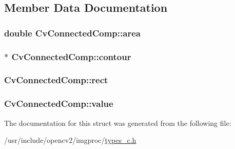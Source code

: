 \subsection{Member Data Documentation}
\hypertarget{structCvConnectedComp_affec9c260f6ca4fd3fae028f0ad3d9a4}{
\subsubsection[{area}]{\setlength{\rightskip}{0pt plus 5cm}double Cv\-Connected\-Comp\-::area}}\label{structCvConnectedComp_affec9c260f6ca4fd3fae028f0ad3d9a4}
\hypertarget{structCvConnectedComp_ae4f461290aa042a2dcd3b45ae03d9feb}{
\subsubsection[{contour}]{$\ast$ Cv\-Connected\-Comp\-::contour}}\label{structCvConnectedComp_ae4f461290aa042a2dcd3b45ae03d9feb}
\hypertarget{structCvConnectedComp_a1f86bb7ed32ddf315d19521e20beabcc}{
\subsubsection[{rect}]{ Cv\-Connected\-Comp\-::rect}}\label{structCvConnectedComp_a1f86bb7ed32ddf315d19521e20beabcc}
\hypertarget{structCvConnectedComp_aacf4c20a51f3fc7d8a71c95b46820902}{
\subsubsection[{value}]{ Cv\-Connected\-Comp\-::value}}\label{structCvConnectedComp_aacf4c20a51f3fc7d8a71c95b46820902}


The documentation for this struct was generated from the following file\-:\begin{DoxyCompactItemize}
\item 
/usr/include/opencv2/imgproc/\hyperlink{imgproc_2types__c_8h}{types\-\_\-c.\-h}\end{DoxyCompactItemize}
